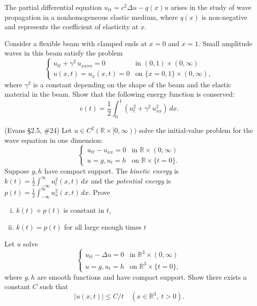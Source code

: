 \documentclass[12pt,fleqn,leqno]{exam}
\newcommand{\R}{\ensuremath{\mathbb{R}}}
\begin{document}
\begin{questions}

\question The partial differential equation $u_{tt} = c^2 \Delta u - q(x) u$ arises in the study of wave propagation in a nonhomogeneous elastic medium, where $q(x)$ is non-negative and represents the coefficient of elasticity at $x$.


\question Consider a flexible beam with clamped ends at $x = 0$ and $x = 1$. Small amplitude waves in this beam satisfy the problem
\[\begin{cases}
u_{tt} + \gamma^2\,u_{xxxx} = 0 & \text{in } (0,1) \times (0,\infty) \\
u(x,t) = u_x(x,t) = 0 & \text{on } \{x = 0,1\} \times (0,\infty),
\end{cases}\]
where $\gamma^2$ is a constant depending on the shape of the beam and the elastic material in the beam. Show that the following energy function is conserved:
\[e(t) = \frac12 \int_0^1 (u_t^2 + \gamma^2\,u_{xx}^2)\,dx.\]

\question (Evans \S2.5, \#24) Let $u \in C^2(\R \times [0, \infty))$ solve the initial-value problem for the wave equation in one dimension:
\[\begin{cases}
u_{tt} - u_{xx} = 0 & \text{in } \R \times (0,\infty) \\
u = g, u_t = h & \text{on } \R \times \{t = 0\}.
\end{cases}\]
Suppose $g,h$ have compact support. The \emph{kinetic energy} is $k(t) = \frac12 \int_{-\infty}^\infty u_t^2(x,t)\,dx$ and the \emph{potential energy} is $p(t) = \frac12 \int_{-\infty}^\infty u_x^2(x,t)\,dx$. Prove

\begin{enumerate}[(i)]
\item $k(t) + p(t)$ is constant in $t$,
\item $k(t) = p(t)$ for all large enough times $t$
\end{enumerate}

\question Let $u$ solve
\[\begin{cases}
u_{tt} - \Delta u = 0 & \text{in } \R^3 \times (0,\infty) \\
u = g, u_t = h & \text{on } \R^3 \times \{t = 0\},
\end{cases}\]
where $g,h$ are smooth functions and have compact support. Show there exists a constant $C$ such that
\[|u(x,t)| \leq C/t \quad (x \in \R^3,\ t > 0).\]

\end{questions}
\end{document}
